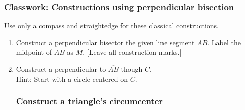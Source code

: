 \documentclass[12pt, oneside]{article}
\begin{document}
\subsubsection*{Classwork: Constructions using perpendicular bisection}
Use only a compass and straightedge for these classical constructions.
  \begin{enumerate}

  \item Construct a perpendicular bisector the given line segment $\overline{AB}$. Label the midpoint of $\overline{AB}$ as $M$.  [Leave all construction marks.]\\
    \vspace{1cm}
    \begin{center}
    \end{center}
    \vspace{3cm}

  \item Construct a perpendicular to $\overline{AB}$ though $C$.\\
  Hint: Start with a circle centered on $C$.
    \vspace{4cm}
    \begin{center}
  \end{center} %

\newpage
\subsubsection*{Construct a triangle's circumcenter}


\end{enumerate}
\end{document}
